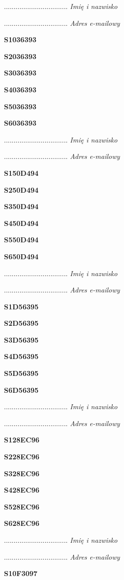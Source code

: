 .................................
\textit{Imię i nazwisko}

.................................
\textit{Adres e-mailowy}

\Large \textbf{S1036393}

\Large \textbf{S2036393}

\Large \textbf{S3036393}

\Large \textbf{S4036393}

\Large \textbf{S5036393}

\Large \textbf{S6036393}

.................................
\textit{Imię i nazwisko}

.................................
\textit{Adres e-mailowy}

\Large \textbf{S150D494}

\Large \textbf{S250D494}

\Large \textbf{S350D494}

\Large \textbf{S450D494}

\Large \textbf{S550D494}

\Large \textbf{S650D494}

.................................
\textit{Imię i nazwisko}

.................................
\textit{Adres e-mailowy}

\Large \textbf{S1D56395}

\Large \textbf{S2D56395}

\Large \textbf{S3D56395}

\Large \textbf{S4D56395}

\Large \textbf{S5D56395}

\Large \textbf{S6D56395}

.................................
\textit{Imię i nazwisko}

.................................
\textit{Adres e-mailowy}

\Large \textbf{S128EC96}

\Large \textbf{S228EC96}

\Large \textbf{S328EC96}

\Large \textbf{S428EC96}

\Large \textbf{S528EC96}

\Large \textbf{S628EC96}

.................................
\textit{Imię i nazwisko}

.................................
\textit{Adres e-mailowy}

\Large \textbf{S10F3097}

